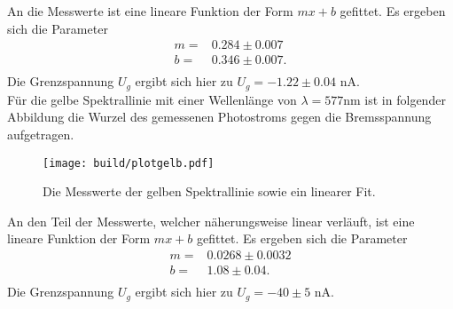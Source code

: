 An die Messwerte ist eine lineare Funktion der Form $mx +b$ gefittet. Es ergeben
sich die Parameter
\begin{align*}
  m = & 0.284 \pm 0.007 \\
  b = & 0.346 \pm 0.007.\\
\end{align*}
Die Grenzspannung $U_g$ ergibt sich hier zu $ U_g = -1.22 \pm 0.04$ \si{\nano\ampere}. \\
\noindent
Für die gelbe Spektrallinie mit einer Wellenlänge von $\lambda = 577 \si{\nano\meter}$
ist in folgender Abbildung die Wurzel des gemessenen Photostroms gegen die Bremsspannung
aufgetragen.
\begin{figure}[H]
  \centering
  \texttt{[image: build/plotgelb.pdf]}
  \label{fig:plotgelb}
  \caption{Die Messwerte der gelben Spektrallinie sowie ein linearer Fit.}
\end{figure}
\noindent
An den Teil der Messwerte, welcher näherungsweise linear verläuft, ist eine lineare Funktion der Form $mx +b$ gefittet. Es ergeben sich die Parameter
\begin{align*}
  m = & 0.0268 \pm 0.0032 \\
  b = & 1.08 \pm 0.04.\\
\end{align*}
Die Grenzspannung $U_g$ ergibt sich hier zu $ U_g = -40 \pm 5$ \si{\nano\ampere}. \\

